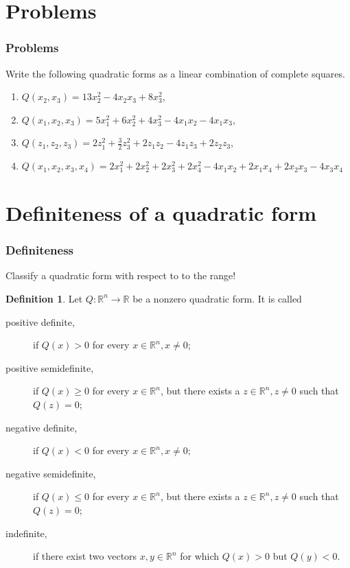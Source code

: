 \documentclass[aspectratio=169,notheorems]{corvinusmetropolis}
\theoremstyle{definition}
\newtheorem{definition}[theorem]{Definition}
\begin{document}
\section{Problems}

\begin{frame}
    \frametitle{Problems}
    \begin{block}{ Write the following quadratic forms as a linear combination of complete squares.}
        \begin{enumerate}
            \item 
            $Q\left( x_2,x_3 \right)=13x_2^2-4x_2x_3+8x_3^2$,
            \item
            $Q\left( x_1,x_2,x_3 \right)=5x_1^2+6x_2^2+4x_3^2-4x_1x_2-4x_1x_3$,
            \item
            $Q\left( z_1,z_2,z_3 \right)=2z_1^2+\frac{3}{2}z_3^2+2z_1z_2-4z_1z_3+2z_2z_3$,
            \item
            $Q\left( x_1,x_2,x_3,x_4 \right)=2x_1^2+2x_2^2+2x_3^2+2x_4^2-4x_1x_2+2x_1x_4+2x_2x_3-4x_3x_4$
        \end{enumerate}
    \end{block}
\end{frame}

\section{Definiteness of a quadratic form}

\begin{frame}
    \frametitle{Definiteness}
    Classify a quadratic form with respect to to the range!
    \begin{definition}
        Let $Q:\mathbb{R}^n\to\mathbb{R}$ be a nonzero quadratic form. It is called
        \begin{description}
            \item[positive definite,] if $Q\left( x \right)>0$ for every $x\in\mathbb{R}^n,x\neq 0$;
            \item[positive semidefinite,] if $ Q\left( x \right)\geq 0$ for every $x\in\mathbb{R}^n$,
                but there exists a $z\in\mathbb{R}^n, z\neq 0$ such that $Q\left( z \right)=0$;
            \item[negative definite,] if $ Q\left( x \right)<0$ for every $x\in\mathbb{R}^n,x\neq 0;$
            \item[negative semidefinite,] if $ Q\left( x \right)\leq 0$ for every $x\in\mathbb{R}^n$,
                but there exists a $z\in\mathbb{R}^n, z\neq 0$ such that $Q\left( z \right)=0$;
            \item[indefinite,] if there exist two vectors $x,y\in\mathbb{R}^n$ for which
                $Q\left( x \right)>0$ but $Q\left( y \right)<0$.
        \end{description}
    \end{definition}
\end{frame}
\end{document}

